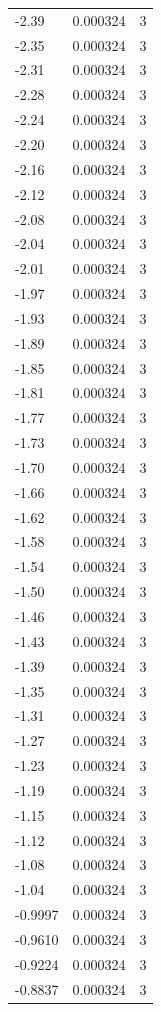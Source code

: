 \begin{longtable}{lrr}
  -2.39 & 0.000324 & 3 \\
  -2.35 & 0.000324 & 3 \\
  -2.31 & 0.000324 & 3 \\
  -2.28 & 0.000324 & 3 \\
  -2.24 & 0.000324 & 3 \\
  -2.20 & 0.000324 & 3 \\
  -2.16 & 0.000324 & 3 \\
  -2.12 & 0.000324 & 3 \\
  -2.08 & 0.000324 & 3 \\
  -2.04 & 0.000324 & 3 \\
  -2.01 & 0.000324 & 3 \\
  -1.97 & 0.000324 & 3 \\
  -1.93 & 0.000324 & 3 \\
  -1.89 & 0.000324 & 3 \\
  -1.85 & 0.000324 & 3 \\
  -1.81 & 0.000324 & 3 \\
  -1.77 & 0.000324 & 3 \\
  -1.73 & 0.000324 & 3 \\
  -1.70 & 0.000324 & 3 \\
  -1.66 & 0.000324 & 3 \\
  -1.62 & 0.000324 & 3 \\
  -1.58 & 0.000324 & 3 \\
  -1.54 & 0.000324 & 3 \\
  -1.50 & 0.000324 & 3 \\
  -1.46 & 0.000324 & 3 \\
  -1.43 & 0.000324 & 3 \\
  -1.39 & 0.000324 & 3 \\
  -1.35 & 0.000324 & 3 \\
  -1.31 & 0.000324 & 3 \\
  -1.27 & 0.000324 & 3 \\
  -1.23 & 0.000324 & 3 \\
  -1.19 & 0.000324 & 3 \\
  -1.15 & 0.000324 & 3 \\
  -1.12 & 0.000324 & 3 \\
  -1.08 & 0.000324 & 3 \\
  -1.04 & 0.000324 & 3 \\
  -0.9997 & 0.000324 & 3 \\
  -0.9610 & 0.000324 & 3 \\
  -0.9224 & 0.000324 & 3 \\
  -0.8837 & 0.000324 & 3 \\

\end{longtable}
